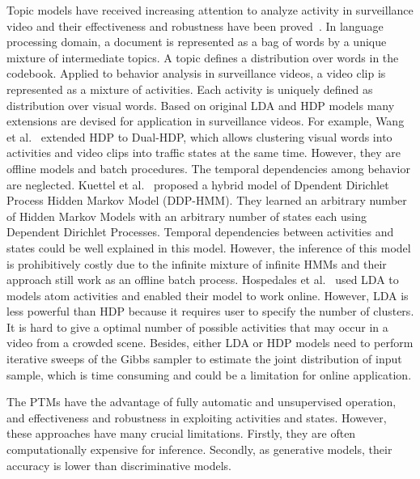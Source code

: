 Topic models have received increasing attention to analyze activity in surveillance video and their effectiveness and robustness have been proved~\cite{hospedales2009markov, hospedales2011identifying, kuettel2010s, li2008global, wang2009unsupervised}. 
In language processing domain, a document is represented as a bag of words by a unique mixture of intermediate topics. A topic defines a distribution over words in the codebook. Applied to behavior analysis in surveillance videos, a video clip is represented as a mixture of activities. Each activity is uniquely defined as distribution over visual words. Based on original LDA \cite{blei2003latent} and HDP \cite{teh2006hdp} models many extensions are devised for application in surveillance videos. 
For example, Wang et al.~\cite{ wang2009unsupervised} extended HDP to Dual-HDP, which allows clustering visual words into activities and video clips into traffic states at the same time. However, they are offline models and batch procedures. The temporal dependencies among behavior are neglected.
Kuettel et al.~\cite{kuettel2010s} proposed a hybrid model of Dpendent Dirichlet Process Hidden Markov Model (DDP-HMM). They learned an arbitrary number of Hidden Markov Models with an arbitrary number of states each using Dependent Dirichlet Processes. Temporal dependencies between activities and states could be well explained in this model. However, the inference of this model is prohibitively costly due to the infinite mixture of infinite HMMs and their approach still work as an offline batch process.
Hospedales et al.~\cite{hospedales2009markov, hospedales2011identifying} used LDA to models atom activities and enabled their model to work online. However, LDA is less powerful than HDP because it requires user to specify the number of clusters. It is hard to give a optimal number of possible activities that may occur in a video from a crowded scene. 
Besides, either LDA or HDP models need to perform iterative sweeps of the Gibbs sampler to estimate the joint distribution of input sample, which is time consuming and could be a limitation for online application. 

The PTMs have the advantage of fully automatic and unsupervised operation, and effectiveness and robustness in exploiting activities and states. However, these approaches have many crucial limitations. Firstly, they are often computationally expensive for inference. Secondly, as generative models, their accuracy is lower than discriminative models.


